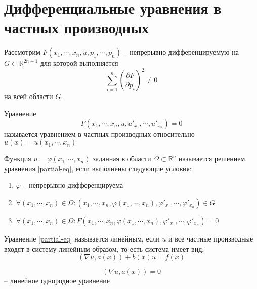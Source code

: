 \documentclass[document.tex]{subfiles}
\begin{document}
\section{Дифференциальные уравнения в частных производных}
Рассмотрим $F(x_1, \cdots, x_n, u, p_1, \cdots, p_n)$ -- непрерывно дифференцируемую на $G \subset \mathbb{R}^{2n + 1}$
для которой выполняется
\[
    \sum_{i = 1}^{n} \left( \frac{\partial F}{\partial p_i} \right)^2 \neq 0
\]
на всей области $G$.

\begin{definition}
    Уравнение 
    \begin{equation}
        \label{partial-eq}
        F(x_1, \cdots, x_n, u, u'_{x_1}, \cdots, u'_{x_n}) = 0
    \end{equation}
    называется уравнением в частных производных относительно $u(x) = u(x_1, \cdots, x_n)$
\end{definition}

\begin{definition}
    Функция $u = \varphi(x_1, \cdots, x_n)$ заданная в области $\Omega \subset \mathbb{R}^n$ называется решением
    уравнения \ref{partial-eq}, если выполнены следующие условия:
    \begin{enumerate}
        \item $\varphi$ -- непрерывно-дифференцируема
        \item $\forall (x_1, \cdots, x_n) \in \Omega: (x_1, \cdots, x_n, \varphi(x_1, \cdots, x_n), \varphi'_{x_1},
            \cdots, \varphi'_{x_n}) \in G$
        \item $\forall (x_1, \cdots, x_n) \in \Omega: F(x_1, \cdots, x_n, \varphi(x_1, \cdots, x_n), \varphi'_{x_1},
            \cdots, \varphi'_{x_n}) = 0$
    \end{enumerate}
\end{definition}

\begin{definition}
    Уравнение \ref{partial-eq} называется линейным, если $u$ и все частные производные входят в систему линейным
    образом, то есть система имеет вид:
    \begin{equation}
        \label{part-lin}
        (\nabla u, a(x)) + b(x)u = f(x)
    \end{equation}
\end{definition}

\begin{definition}
    \begin{equation}
        \label{hom-lin}
        (\nabla u, a(x)) = 0
    \end{equation}
    -- линейное однородное уравнение
\end{definition}
\end{document}
